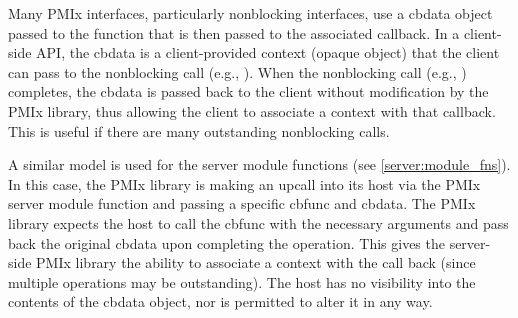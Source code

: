 Many \ac{PMIx} interfaces, particularly nonblocking interfaces, use a cbdata object passed to the function that is then passed to the associated callback. In a client-side \ac{API}, the cbdata is a client-provided context (opaque object) that the client can pass to the nonblocking call (e.g., ). When the nonblocking call (e.g., ) completes, the cbdata is passed back to the client without modification by the \ac{PMIx} library, thus allowing the client to associate a context with that callback. This is useful if there are many outstanding nonblocking calls.

A similar model is used for the server module functions (see \ref{server:module_fns}). In this case, the \ac{PMIx} library is making an upcall into its host via the \ac{PMIx} server module function and passing a specific cbfunc and cbdata. The \ac{PMIx} library expects the host to call the cbfunc with the necessary arguments and pass back the original cbdata upon completing the operation. This gives the server-side \ac{PMIx} library the ability to associate a context with the call back (since multiple operations may be outstanding). The host has no visibility into the contents of the cbdata object, nor is permitted to alter it in any way.


